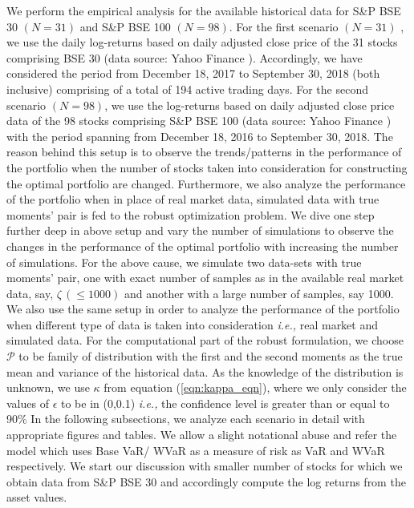 \documentclass[12pt]{article}
\numberwithin{equation}{section}
\begin{document}
We perform the empirical analysis for the available historical data for S\&P BSE 30 $(N = 31)$ and S\&P BSE 100 $(N = 98)$. For the first scenario $(N = 31)$ , we use the daily log-returns based on daily adjusted close price of the 31 stocks comprising BSE 30 (data source: Yahoo Finance \cite{yf}). Accordingly, we have considered the period from December 18, 2017 to September 30, 2018 (both inclusive) comprising of a total of 194 active trading days. For the second scenario $(N = 98)$, we use the log-returns based on daily adjusted close price data of the 98 stocks comprising S\&P BSE 100 (data source: Yahoo Finance \cite{yf}) with the period spanning from December 18, 2016 to September 30, 2018. The reason behind this setup is to observe the trends/patterns in the performance of the portfolio when the number of stocks taken into consideration for constructing the optimal portfolio are changed. Furthermore, we also analyze the performance of the portfolio when in place of real market data, simulated data with true moments' pair is fed to the robust optimization problem. We dive one step further deep in above setup and vary the number of simulations to observe the changes in the performance of the optimal portfolio with increasing the number of simulations. For the above cause, we simulate two data-sets with true moments' pair, one with exact number of samples as in the available real market data, say, $\zeta \, (\leq 1000)$ and another with a large number of samples, say 1000. We also use the same setup in order to analyze the performance of the portfolio when different type of data is taken into consideration \textit{i.e.,} real market and simulated data. For the computational part of the robust formulation, we choose $\mathcal{P}$ to be family of distribution with the first and the second moments as the true mean and variance of the historical data. As the knowledge of the distribution is unknown, we use $\kappa$ from equation (\ref{eqn:kappa_eqn}), where we only consider the values of $\epsilon$ to be in (0,0.1) \textit{i.e.,} the confidence level is greater than or equal to 90\% In the following subsections, we analyze each scenario in detail with appropriate figures and tables. We allow a slight notational abuse and refer the model which uses Base VaR/ WVaR as a measure of risk as VaR and WVaR respectively. We start our discussion with smaller number of stocks for which we obtain data from S\&P BSE 30 and accordingly compute the log returns from the asset values.
\end{document}
